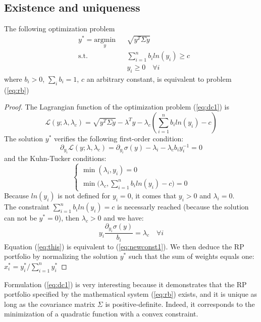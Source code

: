 \subsection{Existence and uniqueness}
\begin{theorem}
The following optimization problem
\begin{equation}\label{eq:dc1}
\begin{aligned}
& y^* = \underset{y}{\text{argmin}}
&& \sqrt{y^T \Sigma y}\\
& \text{s.t.}
&&\sum_{i=1}^n b_i ln(y_i) \geq c\\
&&&y_i \geq 0 \hspace{1em} \forall i
\end{aligned}
\end{equation}
where $b_i > 0$, $\sum_i b_i = 1$, $c$ an arbitrary constant, is equivalent to problem (\ref{eq:rb})
\end{theorem} 
\begin{proof}
The Lagrangian function of the optimization problem (\ref{eq:dc1}) is
\begin{equation}
\mathcal{L}(y;\lambda,\lambda_c) = \sqrt{y^T \Sigma y} - \lambda^Ty - \lambda_c\left(\sum_{i=1}^n b_i ln(y_i) - c\right)
\end{equation}
The solution $y^*$ verifies the following first-order condition:
\begin{equation}
\partial_{y_i}\mathcal{L}(y;\lambda,\lambda_c) = \partial_{y_i}\sigma(y) - \lambda_i - \lambda_c b_i y_i^{-1} = 0
\end{equation}
and the Kuhn-Tucker conditions:
\begin{equation}
\begin{cases}
\min(\lambda_i,y_i)=0\\
\min\big(\lambda_c,\sum_{i=1}^n b_i ln(y_i) - c\big) = 0
\end{cases}
\end{equation}
Because $ln(y_i)$ is not defined for $y_i = 0$, it comes that $y_i > 0$ and $\lambda_i = 0$.\\
The constraint $\sum_{i=1}^n b_i ln(y_i) = c$ is necessarly reached (because the solution can not be $y^* = 0$), then $\lambda_c >0$ and we have:
\begin{equation}\label{eq:this}
y_i \frac{\partial_{y_i}\sigma(y)}{b_i}= \lambda_c \hspace{1em} \forall i
\end{equation}
Equation (\ref{eq:this}) is equivalent to (\ref{eq:newconst1}). We then deduce the RP portfolio by normalizing the solution $y^*$ such that the sum of weights equals one: $x_i^* =y_i^*/\sum_{i=1}^n y_i^*$
\end{proof}
Formulation (\ref{eq:dc1}) is very interesting because it demonstrates that the RP portfolio specified by the mathematical system (\ref{eq:rb}) exists, and it is unique as long as the covariance matrix $\Sigma$ is positive-definite. Indeed, it corresponds to the minimization of a quadratic function with a convex constraint.

